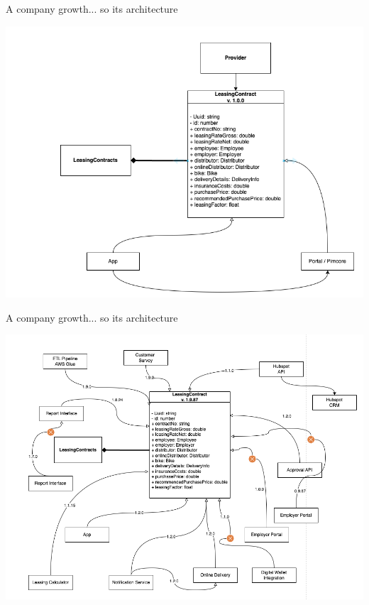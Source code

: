 \begin{frame}{A company growth... so its architecture}
  \begin{center}
    \includegraphics[scale=.35]{./assets/model2}
  \end{center}
\end{frame}


\begin{frame}{A company growth... so its architecture}
  \begin{center}
    \includegraphics[scale=.3]{./assets/model3}
  \end{center}
\end{frame}


